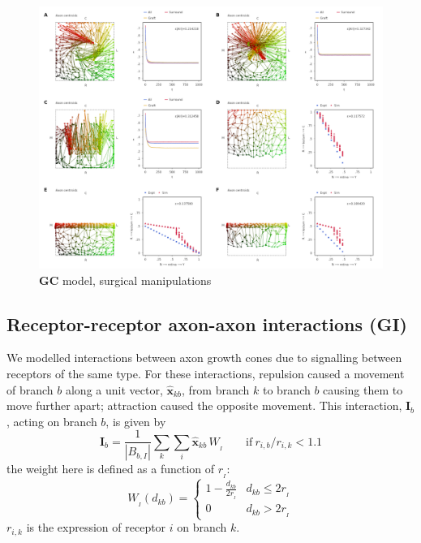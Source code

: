 \documentclass[11pt, a4paper]{article}
\begin{document}
\begin{figure}
\includegraphics[width=\linewidth]{./images/fig_GC_surgical.png}
\caption{$\mathbf{GC}$ model, surgical manipulations}
\label{f:GCsurg}
\end{figure}

\subsection*{Receptor-receptor axon-axon interactions (GI)}

We modelled interactions between axon growth cones due to signalling between
receptors of the same type. For these interactions, repulsion caused a
movement of branch $b$ along a unit vector, $\hat{\mathbf{x}}_{kb}$, from
branch $k$ to branch $b$ causing them to move further apart; attraction caused
the opposite movement. This interaction, $\mathbf{I}_b$, acting on branch $b$,
is given by
%
\begin{equation}
\mathbf{I}_b
= \frac{1}{|B_{b,I}|} \sum_k \sum_i \hat{\mathbf{x}}_{kb}\,W_{\!_I} \qquad \mathrm{if}~r_{i,b}
/ r_{i,k} < 1.1
\end{equation}
%
the weight here is defined as a function of $r_{\!_I}$:
%
\begin{equation}
W_{\!_I}(d_{kb}) = \begin{cases}
      1 - \frac{d_{kb}}{2r_{\!_I}}   & d_{kb} \leq 2r_{\!_I} \\
     0 & d_{kb} > 2r_{\!_I}
     \end{cases}
\end{equation}
$r_{i,k}$ is the expression of receptor $i$ on branch $k$.
\end{document}
